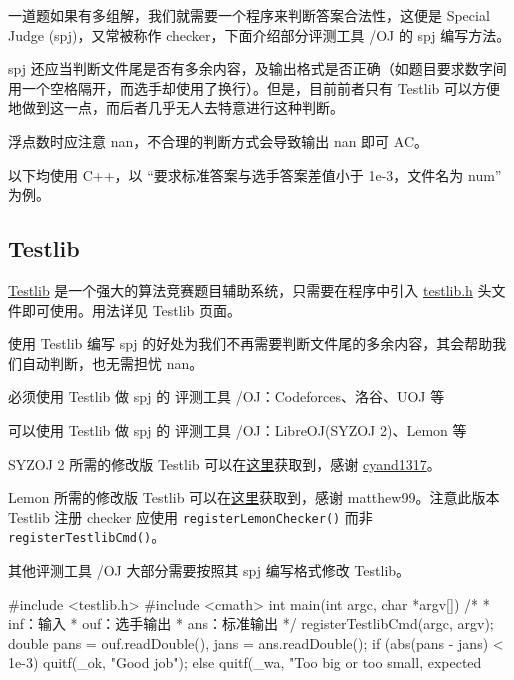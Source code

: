 
一道题如果有多组解，我们就需要一个程序来判断答案合法性，这便是 Special Judge (spj)，又常被称作 checker，下面介绍部分评测工具 /OJ 的 spj 编写方法。

\begin{WARNING}{}{}
spj 还应当判断文件尾是否有多余内容，及输出格式是否正确（如题目要求数字间用一个空格隔开，而选手却使用了换行）。但是，目前前者只有 Testlib 可以方便地做到这一点，而后者几乎无人去特意进行这种判断。

浮点数时应注意 nan，不合理的判断方式会导致输出 nan 即可 AC。

\end{WARNING}


以下均使用 C++，以 “要求标准答案与选手答案差值小于 1e-3，文件名为 num” 为例。

\subsection{Testlib}

\href{https://codeforces.com/testlib}{Testlib} 是一个强大的算法竞赛题目辅助系统，只需要在程序中引入 \href{https://github.com/MikeMirzayanov/testlib/blob/master/testlib.h}{testlib.h} 头文件即可使用。用法详见  Testlib  页面。

使用 Testlib 编写 spj 的好处为我们不再需要判断文件尾的多余内容，其会帮助我们自动判断，也无需担忧 nan。

必须使用 Testlib 做 spj 的 评测工具 /OJ：Codeforces、洛谷、UOJ 等

可以使用 Testlib 做 spj 的 评测工具 /OJ：LibreOJ(SYZOJ 2)、Lemon 等

SYZOJ 2 所需的修改版 Testlib 可以在\href{https://pastebin.com/3GANXMG7}{这里}获取到，感谢 \href{https://loj.ac/article/124}{cyand1317}。

Lemon 所需的修改版 Testlib 可以在\href{https://paste.ubuntu.com/p/JsTspHHnmB/}{这里}获取到，感谢 matthew99。注意此版本 Testlib 注册 checker 应使用 \texttt{registerLemonChecker()} 而非 \texttt{registerTestlibCmd()}。

其他评测工具 /OJ 大部分需要按照其 spj 编写格式修改 Testlib。

\begin{cppcode}
#include <testlib.h>
#include <cmath>
int main(int argc, char *argv[]) {
  /*
   * inf：输入
   * ouf：选手输出
   * ans：标准输出
   */
  registerTestlibCmd(argc, argv);
  double pans = ouf.readDouble(), jans = ans.readDouble();
  if (abs(pans - jans) < 1e-3)
    quitf(_ok, "Good job");
  else
    quitf(_wa, "Too big or too small, expected %
}
\end{cppcode}

